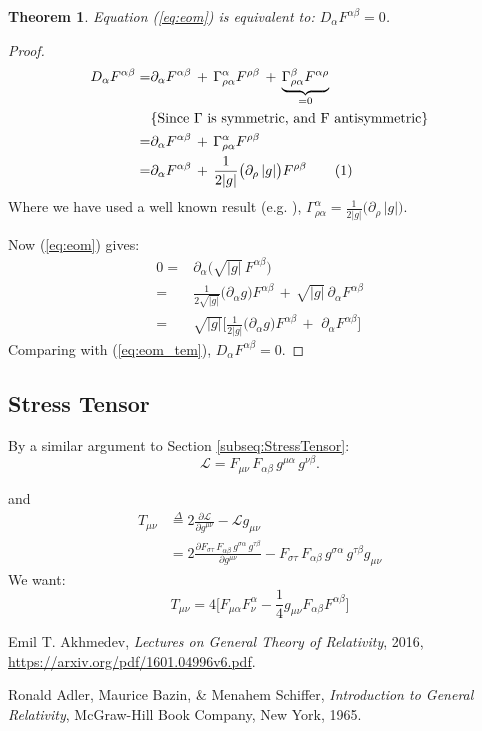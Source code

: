 \documentclass[]{article}
\newcommand{\Lagr}{\mathscr{L}}
\newcommand\numberthis{\addtocounter{equation}{1}\tag{\theequation}}
\newtheorem{theorem}{Theorem}
\begin{document}
\begin{theorem}
	Equation (\ref{eq:eom}) is equivalent to: $D_\alpha F^{\alpha\beta} = 0$.
\end{theorem}
\begin{proof}
	\begin{align*}
	D_\alpha F^{\alpha\beta} =& \partial_\alpha F^{\alpha\beta} \, + \, \Gamma^{\alpha}_{\rho\alpha}F^{\rho\beta}\,+\,\underbrace{\Gamma^\beta_{\rho\alpha}F^{\alpha\rho}}_{=0}\\
	&\text{\{Since $\Gamma$ is symmetric, and F antisymmetric\}} \\
	=& \partial_\alpha F^{\alpha\beta} \, + \, \Gamma^{\alpha}_{\rho\alpha}F^{\rho\beta}\\
	=& \partial_\alpha F^{\alpha\beta} \, + \, \frac{1}{2|g|}\big(\partial_\rho \, |g|\big)F^{\rho\beta} \numberthis \label{eq:eom_tem}
	\end{align*}
	Where we have used a well known result (e.g. \cite[equation (3.11)]{abs1965}), $\Gamma^{\alpha}_{\rho\alpha}=\frac{1}{2|g|}\big(\partial_\rho \, |g|\big)$.
	
	Now (\ref{eq:eom}) gives:
	\begin{align*}
	0 =& \partial_\alpha \big(\sqrt{|g|} \, F^{\alpha\beta} \big)\\
	=& \frac{1}{2\sqrt{|g|}} \big(\partial_\alpha g\big) F^{\alpha\beta} \, + \, \sqrt{|g|} \, \partial_\alpha F^{\alpha\beta}\\
	=& \sqrt{|g|} \big[\frac{1}{2|g|} \big(\partial_\alpha g\big) F^{\alpha\beta} \, + \, \, \partial_\alpha F^{\alpha\beta}\big]
	\end{align*}
	Comparing with (\ref{eq:eom_tem}),  $D_\alpha F^{\alpha\beta} = 0$.
\end{proof}
\subsection{Stress Tensor}
By a similar argument to Section \ref{subseq:StressTensor}:
\begin{equation}
\Lagr= F_{\mu\nu}\, F_{\alpha\beta} \, g^{\mu\alpha} \, g^{\nu\beta}.
\label {eq:a}
\end{equation}

and
\begin{align}
T_{\mu\nu}&\overset{\Delta}{=}2 \frac{\partial \Lagr}{\partial g^{\mu\nu}} - \Lagr g_{\mu\nu}\\
&=2\frac{\partial F_{\sigma\tau}\, F_{\alpha\beta} \, g^{\sigma\alpha} \, g^{\tau\beta}}{\partial g^{\mu\nu}} - F_{\sigma\tau}\, F_{\alpha\beta} \, g^{\sigma\alpha} \, g^{\tau\beta} g_{\mu\nu}
\end{align}
We want:
$$T_{\mu\nu} = 4\big[F_{\mu\alpha} F^\alpha_\nu - \frac{1}{4}g_{\mu\nu} F_{\alpha\beta} F^{\alpha\beta}\big]$$

\begin{thebibliography}{9}

Emil T. Akhmedev,
\emph{Lectures on General Theory of Relativity},
2016,
\url{https://arxiv.org/pdf/1601.04996v6.pdf}.

Ronald Adler, Maurice Bazin, \& Menahem Schiffer,
\emph{Introduction to General Relativity},
McGraw-Hill Book Company, New York,
1965.
\end{thebibliography}
\end{document}
